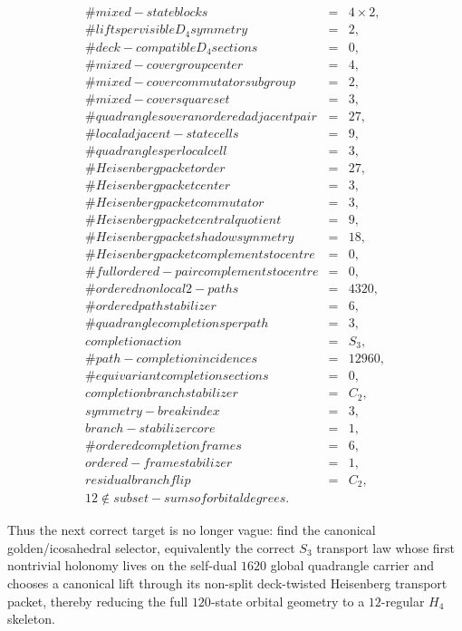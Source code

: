 \documentclass[12pt,a4paper]{article}
\def\text#1{#1}%
\theoremstyle{definition}
\begin{document}
\[\begin{array}{rcl}
\#\text{mixed-state blocks} &=& 4\times 2,\\
\#\text{lifts per visible }D_4\text{ symmetry} &=& 2,\\
\#\text{deck-compatible }D_4\text{ sections} &=& 0,\\
\#\text{mixed-cover group center} &=& 4,\\
\#\text{mixed-cover commutator subgroup} &=& 2,\\
\#\text{mixed-cover square set} &=& 3,\\
\#\text{quadrangles over an ordered adjacent pair} &=& 27,\\
\#\text{local adjacent-state cells} &=& 9,\\
\#\text{quadrangles per local cell} &=& 3,\\
\#\text{Heisenberg packet order} &=& 27,\\
\#\text{Heisenberg packet center} &=& 3,\\
\#\text{Heisenberg packet commutator} &=& 3,\\
\#\text{Heisenberg packet central quotient} &=& 9,\\
\#\text{Heisenberg packet shadow symmetry} &=& 18,\\
\#\text{Heisenberg packet complements to centre} &=& 0,\\
\#\text{full ordered-pair complements to centre} &=& 0,\\
\#\text{ordered nonlocal }2\text{-paths} &=& 4320,\\
\#\text{ordered path stabilizer} &=& 6,\\
\#\text{quadrangle completions per path} &=& 3,\\
\text{completion action} &=& S_3,\\
\#\text{path-completion incidences} &=& 12960,\\
\#\text{equivariant completion sections} &=& 0,\\
\text{completion branch stabilizer} &=& C_2,\\
\text{symmetry-break index} &=& 3,\\
\text{branch-stabilizer core} &=& 1,\\
\#\text{ordered completion frames} &=& 6,\\
\text{ordered-frame stabilizer} &=& 1,\\
\text{residual branch flip} &=& C_2,\\
12\notin\text{subset-sums of orbital degrees}. &&
\end{array}
\]

Thus the next correct target is no longer vague: find the canonical
golden/icosahedral selector, equivalently the correct $S_3$ transport
law whose first nontrivial holonomy lives on the self-dual $1620$
global quadrangle carrier and chooses a canonical lift through its
non-split deck-twisted Heisenberg transport packet,
thereby reducing the full $120$-state orbital geometry to a
$12$-regular $H_4$ skeleton.
\end{document}
